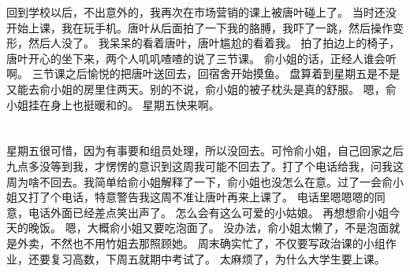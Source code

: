 回到学校以后，不出意外的，我再次在市场营销的课上被唐叶碰上了。
当时还没开始上课，我在玩手机。唐叶从后面拍了一下我的胳膊，我吓了一跳，然后操作变形，然后人没了。
我呆呆的看着唐叶，唐叶尴尬的看着我。
拍了拍边上的椅子，唐叶开心的坐下来，两个人叽叽喳喳的说了三节课。
俞小姐的话，正经人谁会听啊。
三节课之后愉悦的把唐叶送回去，回宿舍开始摸鱼。
盘算着到星期五是不是又能去俞小姐的房里住两天。别的不说，俞小姐的被子枕头是真的舒服。
嗯，俞小姐挂在身上也挺暖和的。
星期五快来啊。

\chapter{}
星期五很可惜，因为有事要和组员处理，所以没回去。可怜俞小姐，自己回家之后九点多没等到我，才愣愣的意识到这周我可能不回去了。打了个电话给我，问我这周为啥不回去。我简单给俞小姐解释了一下，俞小姐也没怎么在意。过了一会俞小姐又打了个电话，特意警告我这周不准让唐叶再来上课了。
电话里嗯嗯嗯的同意，电话外面已经差点笑出声了。
怎么会有这么可爱的小姑娘。
再想想俞小姐今天的晚饭。
嗯，大概俞小姐又要吃泡面了。
没办法，俞小姐太懒了，不是泡面就是外卖，不然也不用竹姐去那照顾她。
周末确实忙了，不仅要写政治课的小组作业，还要复习高数，下周五就期中考试了。
太麻烦了，为什么大学生要上课。


